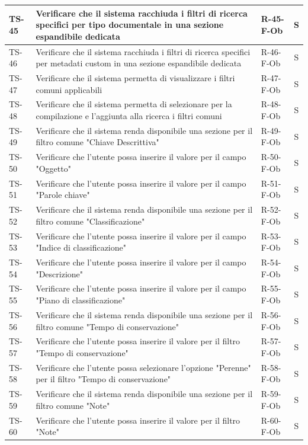 \documentclass[a4paper,12pt]{article}
\begin{document}
\begin{longtable}{|p{1.5cm}|p{8.3cm}|p{2.4cm}|c|}
\hline
TS-45 & Verificare che il sistema racchiuda i filtri di ricerca specifici per tipo documentale in una sezione espandibile dedicata & R-45-F-Ob & S \\
\hline
TS-46 & Verificare che il sistema racchiuda i filtri di ricerca specifici per metadati custom in una sezione espandibile dedicata & R-46-F-Ob & S \\
\hline
TS-47 & Verificare che il sistema permetta di visualizzare i filtri comuni applicabili & R-47-F-Ob & S \\
\hline
TS-48 & Verificare che il sistema permetta di selezionare per la compilazione e l'aggiunta alla ricerca i filtri comuni & R-48-F-Ob & S \\
\hline
TS-49 & Verificare che il sistema renda disponibile una sezione per il filtro comune "Chiave Descrittiva" & R-49-F-Ob & S \\
\hline
TS-50 & Verificare che l'utente possa inserire il valore per il campo "Oggetto" & R-50-F-Ob & S \\
\hline
TS-51 & Verificare che l'utente possa inserire il valore per il campo "Parole chiave" & R-51-F-Ob & S \\
\hline
TS-52 & Verificare che il sistema renda disponibile una sezione per il filtro comune "Classificazione" & R-52-F-Ob & S \\
\hline
TS-53 & Verificare che l'utente possa inserire il valore per il campo "Indice di classificazione" & R-53-F-Ob & S \\
\hline
TS-54 & Verificare che l'utente possa inserire il valore per il campo "Descrizione" & R-54-F-Ob & S \\
\hline
TS-55 & Verificare che l'utente possa inserire il valore per il campo "Piano di classificazione" & R-55-F-Ob & S \\
\hline
TS-56 & Verificare che il sistema renda disponibile una sezione per il filtro comune "Tempo di conservazione" & R-56-F-Ob & S \\
\hline
TS-57 & Verificare che l'utente possa inserire il valore per il filtro "Tempo di conservazione" & R-57-F-Ob & S \\
\hline
TS-58 & Verificare che l'utente possa selezionare l'opzione "Perenne" per il filtro "Tempo di conservazione" & R-58-F-Ob & S \\
\hline
TS-59 & Verificare che il sistema renda disponibile una sezione per il filtro comune "Note" & R-59-F-Ob & S \\
\hline
TS-60 & Verificare che l'utente possa inserire il valore per il filtro "Note" & R-60-F-Ob & S \\

\end{longtable}
\end{document}

